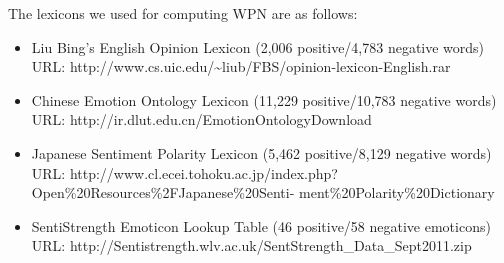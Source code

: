 \documentclass[english]{jnlp_1.4}
\begin{document}
The lexicons we used for computing WPN are as follows:
\begin{itemize}
\item Liu Bing's English Opinion Lexicon (2,006 positive/4,783 negative words)\\
URL: http://www.cs.uic.edu/{\textasciitilde}liub/FBS/opinion-lexicon-English.rar
\item Chinese Emotion Ontology Lexicon (11,229 positive/10,783 negative words)\\
URL: http://ir.dlut.edu.cn/EmotionOntologyDownload
\item Japanese Sentiment Polarity Lexicon (5,462 positive/8,129 negative words)\\
URL: http://www.cl.ecei.tohoku.ac.jp/index.php?Open\%20Resources\%2FJapanese\%20Senti-
ment\%20Polarity\%20Dictionary
\item SentiStrength Emoticon Lookup Table (46 positive/58 negative emoticons)\\
URL: http://Sentistrength.wlv.ac.uk/SentStrength\_Data\_Sept2011.zip
\end{itemize}
\end{document}
